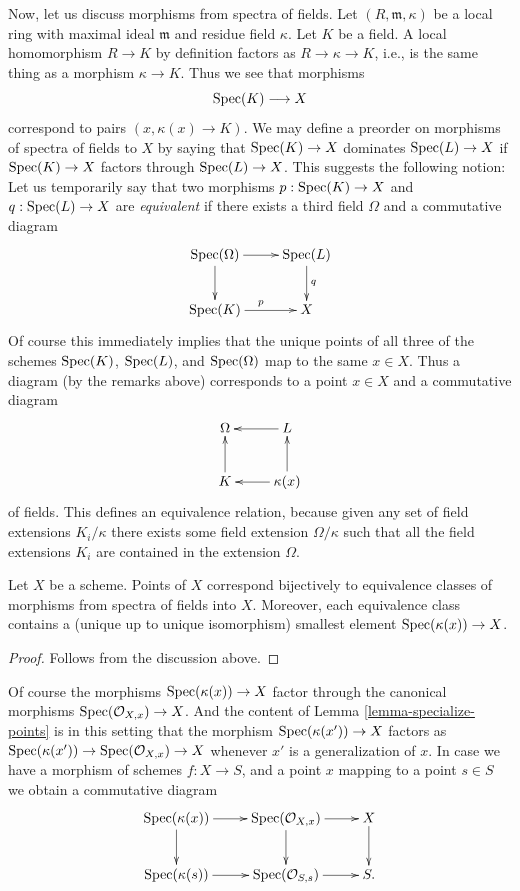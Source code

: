 \noindent
Now, let us discuss morphisms from spectra of fields.
Let $(R, \mathfrak m, \kappa)$ be a local ring
with maximal ideal $\mathfrak m$ and residue field $\kappa$.
Let $K$ be a field. A local homomorphism $R \to K$ by definition
factors as $R \to \kappa \to K$, i.e., is the same thing as
a morphism $\kappa \to K$. Thus we see that morphisms
$$
\mathop{\mathrm{Spec}}(K) \longrightarrow X
$$
correspond to pairs $(x, \kappa(x) \to K)$. We may define
a preorder on morphisms of spectra of fields to $X$
by saying that $\mathop{\mathrm{Spec}}(K) \to X$ dominates
$\mathop{\mathrm{Spec}}(L) \to X$ if $\mathop{\mathrm{Spec}}(K) \to X$
factors through $\mathop{\mathrm{Spec}}(L) \to X$. This suggests
the following notion: Let us temporarily
say that two morphisms $p : \mathop{\mathrm{Spec}}(K) \to X$ and
$q : \mathop{\mathrm{Spec}}(L) \to X$ are {\it equivalent} if there exists
a third field $\Omega$ and a commutative diagram
$$
\xymatrix{
\Spec(\Omega) \ar[r] \ar[d] &
\Spec(L) \ar[d]^q \\
\Spec(K) \ar[r]^p &
X
}
$$
Of course this immediately implies that the unique points of
all three of the schemes $\mathop{\mathrm{Spec}}(K)$,
$\mathop{\mathrm{Spec}}(L)$, and $\mathop{\mathrm{Spec}}(\Omega)$
map to the same $x \in X$. Thus a diagram (by the remarks above)
corresponds to a point $x \in X$ and a commutative diagram
$$
\xymatrix{
\Omega &
L \ar[l] \\
K \ar[u] &
\kappa(x) \ar[l] \ar[u]
}
$$
of fields. This defines an equivalence relation, because given
any set of field extensions $K_i/\kappa$ there exists
some field extension $\Omega/\kappa$ such that all
the field extensions $K_i$ are contained in the extension $\Omega$.

\begin{lemma}
\label{lemma-characterize-points}
Let $X$ be a scheme. Points of $X$ correspond bijectively
to equivalence classes of morphisms from spectra of
fields into $X$. Moreover, each equivalence class contains
a (unique up to unique isomorphism) smallest element
$\mathop{\mathrm{Spec}}(\kappa(x)) \to X$.
\end{lemma}

\begin{proof}
Follows from the discussion above.
\end{proof}

\noindent
Of course the morphisms $\mathop{\mathrm{Spec}}(\kappa(x)) \to X$
factor through the canonical morphisms
$\mathop{\mathrm{Spec}}(\mathcal{O}_{X, x}) \to X$.
And the content of Lemma \ref{lemma-specialize-points} is in
this setting that the morphism $\mathop{\mathrm{Spec}}(\kappa(x')) \to X$
factors as
$\mathop{\mathrm{Spec}}(\kappa(x')) \to \mathop{\mathrm{Spec}}(\mathcal{O}_{X, x}) \to X$
whenever $x'$ is a generalization of $x$.
In case we have a morphism of schemes $f : X \to S$,
and a point $x$ mapping to a point $s \in S$ we obtain
a commutative diagram
$$
\xymatrix{
\Spec(\kappa(x)) \ar[r] \ar[d] &
\Spec(\mathcal{O}_{X, x}) \ar[r] \ar[d] &
X \ar[d] \\
\Spec(\kappa(s)) \ar[r] &
\Spec(\mathcal{O}_{S, s}) \ar[r] &
S.
}
$$










